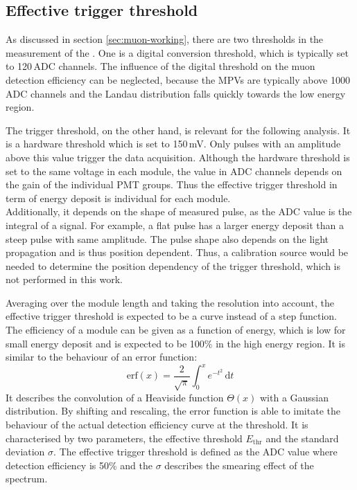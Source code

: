 \subsection{Effective trigger threshold}
As discussed in section \ref{sec:muon-working}, there are two thresholds in the measurement of the \mvs{}. One is a digital conversion threshold, which is typically set to 120\,ADC channels. The influence of the digital threshold on the muon detection efficiency can be neglected, because the MPVs are typically above 1000\,ADC channels and the Landau distribution falls quickly towards the low energy region.

The trigger threshold, on the other hand, is relevant for the following analysis. It is a hardware threshold which is set to 150\,mV. Only pulses with an amplitude above this value trigger the data acquisition. Although the hardware threshold is set to the same voltage in each module, the value in ADC channels depends on the gain of the individual PMT groups. Thus the effective trigger threshold in term of energy deposit is individual for each module. \\
Additionally, it depends on the shape of measured pulse, as the ADC value is the integral of a signal. For example, a flat pulse has a larger energy deposit than a steep pulse with same amplitude. The pulse shape also depends on the light propagation and is thus position dependent. Thus, a calibration source would be needed to determine the position dependency of the trigger threshold, which is not performed in this work.

Averaging over the module length and taking the resolution into account, the effective trigger threshold is expected to be a curve instead of a step function. The efficiency of a module can be given as a function of energy, which is low for small energy deposit and is expected to be 100\% in the high energy region. It is similar to the behaviour of an error function:
\begin{equation}
  \mathrm{erf}(x)=\frac{2}{\sqrt{\pi}} \int_{0}^{x} \! e^{-t^{2}}\, \mathrm{d}t
\end{equation}
It describes the convolution of a Heaviside function $\Theta(x)$ with a Gaussian distribution. By shifting and rescaling, the error function is able to imitate the behaviour of the actual detection efficiency curve at the threshold. It is characterised by two parameters, the effective threshold $E_{\mathrm{thr}}$ and the standard deviation $\sigma$. The effective trigger threshold is defined as the ADC value where detection efficiency is 50\% and the $\sigma$ describes the smearing effect of the spectrum.

